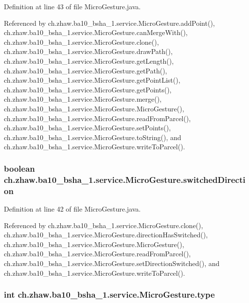 Definition at line 43 of file MicroGesture.java.

Referenced by ch.zhaw.ba10\_\-bsha\_\-1.service.MicroGesture.addPoint(), ch.zhaw.ba10\_\-bsha\_\-1.service.MicroGesture.canMergeWith(), ch.zhaw.ba10\_\-bsha\_\-1.service.MicroGesture.clone(), ch.zhaw.ba10\_\-bsha\_\-1.service.MicroGesture.drawPath(), ch.zhaw.ba10\_\-bsha\_\-1.service.MicroGesture.getLength(), ch.zhaw.ba10\_\-bsha\_\-1.service.MicroGesture.getPath(), ch.zhaw.ba10\_\-bsha\_\-1.service.MicroGesture.getPointList(), ch.zhaw.ba10\_\-bsha\_\-1.service.MicroGesture.getPoints(), ch.zhaw.ba10\_\-bsha\_\-1.service.MicroGesture.merge(), ch.zhaw.ba10\_\-bsha\_\-1.service.MicroGesture.MicroGesture(), ch.zhaw.ba10\_\-bsha\_\-1.service.MicroGesture.readFromParcel(), ch.zhaw.ba10\_\-bsha\_\-1.service.MicroGesture.setPoints(), ch.zhaw.ba10\_\-bsha\_\-1.service.MicroGesture.toString(), and ch.zhaw.ba10\_\-bsha\_\-1.service.MicroGesture.writeToParcel().\hypertarget{classch_1_1zhaw_1_1ba10__bsha__1_1_1service_1_1MicroGesture_aaddd90c10ceefbedf0dc527d93989b84}{
\subsubsection[{switchedDirection}]{\setlength{\rightskip}{0pt plus 5cm}boolean {\bf ch.zhaw.ba10\_\-bsha\_\-1.service.MicroGesture.switchedDirection}}}
\label{classch_1_1zhaw_1_1ba10__bsha__1_1_1service_1_1MicroGesture_aaddd90c10ceefbedf0dc527d93989b84}


Definition at line 42 of file MicroGesture.java.

Referenced by ch.zhaw.ba10\_\-bsha\_\-1.service.MicroGesture.clone(), ch.zhaw.ba10\_\-bsha\_\-1.service.MicroGesture.directionHasSwitched(), ch.zhaw.ba10\_\-bsha\_\-1.service.MicroGesture.MicroGesture(), ch.zhaw.ba10\_\-bsha\_\-1.service.MicroGesture.readFromParcel(), ch.zhaw.ba10\_\-bsha\_\-1.service.MicroGesture.setDirectionSwitched(), and ch.zhaw.ba10\_\-bsha\_\-1.service.MicroGesture.writeToParcel().\hypertarget{classch_1_1zhaw_1_1ba10__bsha__1_1_1service_1_1MicroGesture_ac1ee8b835a0b20d0e3535682eb0d2741}{
\subsubsection[{type}]{\setlength{\rightskip}{0pt plus 5cm}int {\bf ch.zhaw.ba10\_\-bsha\_\-1.service.MicroGesture.type}}}
\label{classch_1_1zhaw_1_1ba10__bsha__1_1_1service_1_1MicroGesture_ac1ee8b835a0b20d0e3535682eb0d2741}


